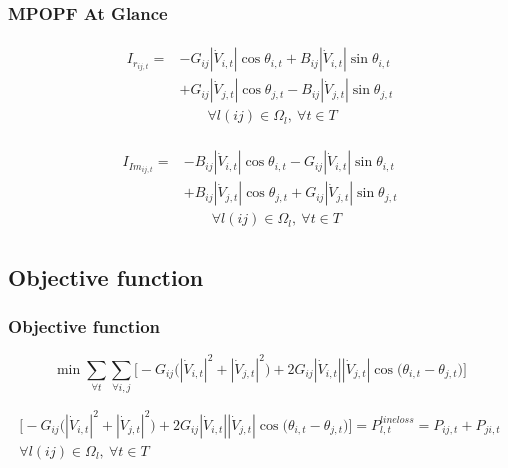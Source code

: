 \documentclass[
	11pt, %
	aspectratio=169, %
]{beamer}
\begin{document}
\begin{frame}
	\frametitle{MPOPF At Glance}
	
	\begin{align*}
		\begin{split}
			I_{r_{ij,t}} = &-G_{ij}\left\lvert \dot{V}_{i,t} \right\rvert \cos{\theta_{i,t}} + B_{ij}\left\lvert \dot{V}_{i,t} \right\rvert \sin{\theta_{i,t}} \\
					&+ G_{ij}\left\lvert \dot{V}_{j,t} \right\rvert \cos{\theta_{j,t}} - B_{ij}\left\lvert \dot{V}_{j,t} \right\rvert \sin{\theta_{j,t}} \\[1em]
			&\qquad \forall l(ij) \in \Omega_{l},\ \forall t \in T
		\end{split}
	\end{align*}

	\begin{align*}
		\begin{split}
			I_{Im_{ij,t}} = &-B_{ij}\left\lvert \dot{V}_{i,t} \right\rvert \cos{\theta_{i,t}} - G_{ij}\left\lvert \dot{V}_{i,t} \right\rvert \sin{\theta_{i,t}} \\
			&+ B_{ij}\left\lvert \dot{V}_{j,t} \right\rvert \cos{\theta_{j,t}} + G_{ij}\left\lvert \dot{V}_{j,t} \right\rvert \sin{\theta_{j,t}} \\[1em]
			&\qquad \forall l(ij) \in \Omega_{l},\ \forall t \in T
		\end{split}
	\end{align*}

\end{frame}

\subsection{Objective function}

\begin{frame}
	\frametitle{Objective function}
	\label{frame:MPOFP_objfunc}

    \begin{equation}
    \label{eq:Mobj}
        \min \sum_{\forall t} \sum_{\forall i,j} \Big[ -G_{ij}\big(\left|\dot{V}_{i,t}\right|^2 + \left|\dot{V}_{j,t}\right|^2\big) + 2G_{ij}\left|\dot{V}_{i,t}\right|\left|\dot{V}_{j,t}\right|\cos\big(\theta_{i,t}-\theta_{j,t}\big) \Big]
    \end{equation}

	\vspace{1.5em}

	\begin{equation}
    \label{eq:Mexpr_loss}
        \begin{gathered}
            \Big[ -G_{ij}\big(\left|\dot{V}_{i,t}\right|^2 + \left|\dot{V}_{j,t}\right|^2\big) + 2G_{ij}\left|\dot{V}_{i,t}\right|\left|\dot{V}_{j,t}\right|\cos\big(\theta_{i,t}-\theta_{j,t}\big) \Big] = P_{l,t}^{line loss} = P_{ij,t} + P_{ji,t} \\[1em]
            \forall l(ij) \in \Omega_{l},\ \forall t \in T
        \end{gathered}
    \end{equation}

\end{frame}
\end{document}
